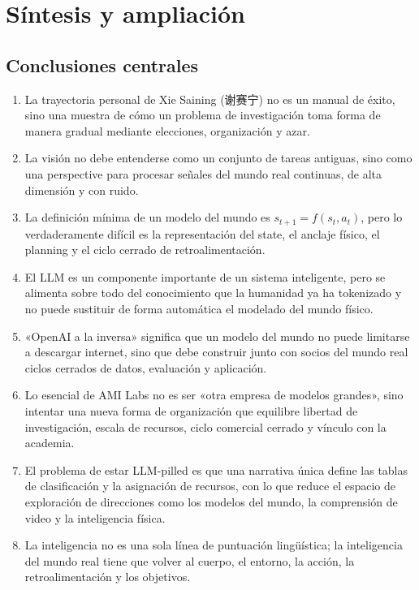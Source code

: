 \section{Síntesis y ampliación}

\subsection{Conclusiones centrales}

\begin{enumerate}
\item La trayectoria personal de Xie Saining (谢赛宁) no es un manual de éxito, sino una muestra de cómo un problema de investigación toma forma de manera gradual mediante elecciones, organización y azar.
\item La visión no debe entenderse como un conjunto de tareas antiguas, sino como una perspective para procesar señales del mundo real continuas, de alta dimensión y con ruido.
\item La definición mínima de un modelo del mundo es $s_{t+1}=f(s_t,a_t)$, pero lo verdaderamente difícil es la representación del state, el anclaje físico, el planning y el ciclo cerrado de retroalimentación.
\item El LLM es un componente importante de un sistema inteligente, pero se alimenta sobre todo del conocimiento que la humanidad ya ha tokenizado y no puede sustituir de forma automática el modelado del mundo físico.
\item «OpenAI a la inversa» significa que un modelo del mundo no puede limitarse a descargar internet, sino que debe construir junto con socios del mundo real ciclos cerrados de datos, evaluación y aplicación.
\item Lo esencial de AMI Labs no es ser «otra empresa de modelos grandes», sino intentar una nueva forma de organización que equilibre libertad de investigación, escala de recursos, ciclo comercial cerrado y vínculo con la academia.
\item El problema de estar LLM-pilled es que una narrativa única define las tablas de clasificación y la asignación de recursos, con lo que reduce el espacio de exploración de direcciones como los modelos del mundo, la comprensión de video y la inteligencia física.
\item La inteligencia no es una sola línea de puntuación lingüística; la inteligencia del mundo real tiene que volver al cuerpo, el entorno, la acción, la retroalimentación y los objetivos.
\end{enumerate}

